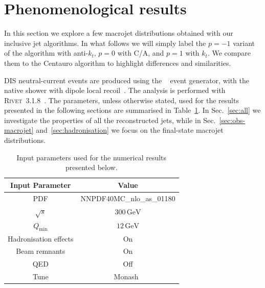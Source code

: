 \section{Phenomenological results}
\label{sec:pheno}
In this section we explore a few macrojet distributions obtained with
our inclusive jet algorithms. In what follows we will simply label the
$p=-1$ variant of the algorithm with anti-$k_t$, $p=0$ with C/A, and
$p=1$ with $k_t$. We compare them to the Centauro algorithm to
highlight differences and similarities.

DIS neutral-current events are produced using the
\PYTHIAn~\cite{Bierlich:2022pfr} event generator, with 
the native \PYTHIA shower with dipole local
recoil~\cite{Cabouat:2017rzi}. 
The analysis is performed with \textsc{Rivet~3.1.8}~\cite{Bierlich:2019rhm}. 
The parameters, unless otherwise stated, used for the results presented 
in the following sections are summarised in Table~\ref{tab:input-params}.
In Sec.~\ref{sec:all} we investigate the properties of all the reconstructed jets, while in Sec.~\ref{sec:obs-macrojet} and~\ref{sec:hadronisation} we focus on the final-state macrojet distributions. 
\begin{table}[t]
\begin{center}
\begin{tabular}{c|c}
\hline\hline
Input Parameter & Value \\
\hline\hline
PDF & NNPDF40MC\_nlo\_as\_01180 \\
$\sqrt{s}$ & $300\,\mathrm{GeV}$\\
$Q_{\mathrm{min}}$ & $12\,\mathrm{GeV}$ \\
Hadronisation effects & On \\
Beam remnants & On \\
QED & Off \\
Tune & Monash~\cite{Skands:2014pea}\\
\hline\hline
\end{tabular}
\end{center}
\caption{Input parameters used for the numerical results presented below.}
\label{tab:input-params}
\end{table}


